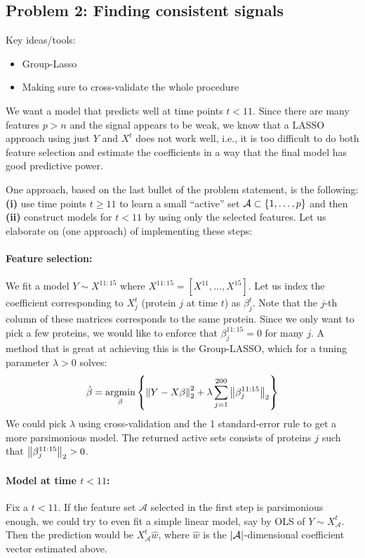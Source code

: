 \subsection*{Problem 2: Finding consistent signals}
Key ideas/tools:
\begin{itemize}
  \item Group-Lasso
  \item Making sure to cross-validate the whole procedure
\end{itemize}

 We want a model that predicts well at time points $t < 11$. Since there are many features $p> n$ and the signal appears to be weak, we know that a LASSO approach using just $Y$ and $X^t$ does not work well, i.e., it is too difficult to do both feature selection and estimate the coefficients in a way that the final model has good predictive power. 

One approach, based on the last bullet of the problem statement, is the following: \textbf{(i)} use time points $t \geq 11$ to learn a small ``active'' set $\mathcal{A} \subset \left\{1,\dotsc,p\right\}$ and then \textbf{(ii)} construct models for $t<11$ by using only the selected features. Let us elaborate on (one approach) of implementing these steps:

\paragraph{Feature selection:} We fit a model $Y \sim X^{11:15}$ where $X^{11:15}=[X^{11},\dotsc, X^{15}]$. Let us index the coefficient corresponding to $X_j^t$ (protein $j$ at time $t$) as $\beta_j^t$. Note that the $j$-th column of these matrices corresponds to the same protein. Since we only want to pick a few proteins, we would like to enforce that $\beta_j^{11:15} =0$ for many $j$. A method that is great at achieving this is the Group-LASSO, which for a tuning parameter $\lambda >0$ solves:
$$ \hat{\beta} = \operatorname*{argmin}_{\beta}\left\{ \left\lVert Y - X\beta\right\rVert_2^2 + \lambda \sum_{j=1}^{200} \left\lVert\beta_j^{11:15}\right\rVert_2\right\}$$
We could pick $\lambda$ using cross-validation and the 1 standard-error rule to get a more parsimonious model. The returned active sets consists of proteins $j$ such that $\left\lVert\beta_j^{11:15}\right\rVert_2>0$.

\paragraph{Model at time $t<11$:} Fix a $t < 11$. If the feature set $\mathcal{A}$ selected in the first step is parsimonious enough, we could try to even fit a simple linear model, say by OLS of $Y \sim X^t_{\mathcal{A}}$. Then the prediction would be $X^t_{\mathcal{A}}\hat{w}$, where $\hat{w}$ is the $\left\lvert\mathcal{A}\right\rvert$-dimensional coefficient vector estimated above.\\

